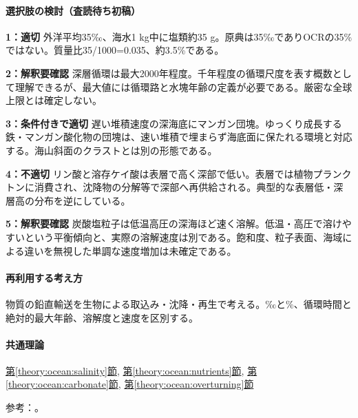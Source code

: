 \paragraph{選択肢の検討（査読待ち初稿）}\mbox{}\par

\noindent\textbf{1：適切} 外洋平均35‰、海水1 kg中に塩類約35 g。原典は35‰でありOCRの35\%ではない。質量比35/1000=\allowbreak{}0.035、約3.5\%である。\par

\noindent\textbf{2：解釈要確認} 深層循環は最大2000年程度。千年程度の循環尺度を表す概数として理解できるが、最大値には循環路と水塊年齢の定義が必要である。厳密な全球上限とは確定しない。\par

\noindent\textbf{3：条件付きで適切} 遅い堆積速度の深海底にマンガン団塊。ゆっくり成長する鉄・マンガン酸化物の団塊は、速い堆積で埋まらず海底面に保たれる環境と対応する。海山斜面のクラストとは別の形態である。\par

\noindent\textbf{4：不適切} リン酸と溶存ケイ酸は表層で高く深部で低い。表層では植物プランクトンに消費され、沈降物の分解等で深部へ再供給される。典型的な表層低・深層高の分布を逆にしている。\par

\noindent\textbf{5：解釈要確認} 炭酸塩粒子は低温高圧の深海ほど速く溶解。低温・高圧で溶けやすいという平衡傾向と、実際の溶解速度は別である。飽和度、粒子表面、海域による違いを無視した単調な速度増加は未確定である。\par

\paragraph{再利用する考え方} 物質の鉛直輸送を生物による取込み・沈降・再生で考える。‰と\%、循環時間と絶対的最大年齢、溶解度と速度を区別する。

\paragraph{共通理論} \hyperref[theory:ocean:salinity]{第\ref*{theory:ocean:salinity}節}, \hyperref[theory:ocean:nutrients]{第\ref*{theory:ocean:nutrients}節}, \hyperref[theory:ocean:carbonate]{第\ref*{theory:ocean:carbonate}節}, \hyperref[theory:ocean:overturning]{第\ref*{theory:ocean:overturning}節}

\par 参考：\cite{noaa_sea_salt,noaa_nutrient_observations,noaa_overturning,feely_carbonate2004,jamstec_deep_resources}。

